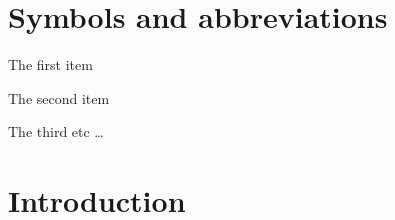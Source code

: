 \documentclass[dissertation]{aaltoseries}
\newcommand{\listofsymbols}{%
  \chapter*{Symbols and abbreviations}%
}
\begin{document}

\tableofcontents

\listofpublications


\listofsymbols


\begin{description} \itemsep2pt
  \item[First] The first item
  \item[$\int$ Second] The second item
  \item[Third] The third etc \ldots
\end{description}

\chapter{Introduction}
\setcounter{page}{1}




% 

%
%




\end{document}
